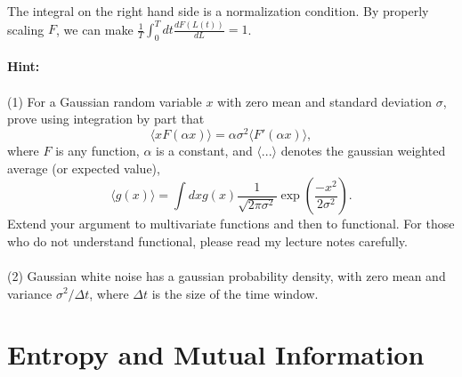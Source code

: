 \documentclass{article}
\begin{document}
The integral on the right hand side is a normalization condition. By properly scaling $F$, we can make $\frac{1}{T} \int_0^T dt \frac{dF(L(t))}{dL} = 1$. 
\\
\\
\textbf{Hint:} 
\\
\\
(1) For a Gaussian random variable $x$ with zero mean and standard deviation $\sigma$, prove using integration by part that 
\begin{equation}
\langle xF(\alpha x) \rangle = \alpha \sigma^2 \langle F'(\alpha x) \rangle ,
\end{equation}
where $F$ is any function,  $\alpha$ is a constant, and $\langle ... \rangle $ denotes the gaussian weighted average (or expected value), 
\begin{equation}
\langle g(x) \rangle = \int dx g(x) \frac{1}{\sqrt{2\pi\sigma^2} } \exp (\frac{-x^2}{2\sigma^2}).
\end{equation}
Extend your argument to multivariate functions and then to functional. For those who do not understand functional, please read my lecture notes carefully. 
 \\
 \\
 (2) Gaussian white noise has a gaussian probability density, with zero mean and variance $\sigma^2 /\Delta t$, where $\Delta t$ is the size of the time window. 
 
 \section*{Entropy and Mutual Information}
\end{document}
